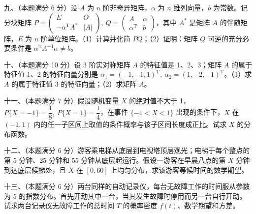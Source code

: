 \documentclass[UTF8,12pt]{ctexart}
\begin{document}
九、（本题满分 6 分）设 \(\displaystyle A\) 为 \(\displaystyle n\) 阶非奇异矩阵，\(\displaystyle \alpha\) 为 \(\displaystyle n\) 维列向量，\(\displaystyle b\) 为常数。记分块矩阵 \(\displaystyle P=\begin{pmatrix}E&O\\-\alpha^{\mathrm T}A^*&|A|\end{pmatrix},\allowbreak \ Q=\begin{pmatrix}A&\alpha\\\alpha^{\mathrm T}&b\end{pmatrix}\)，其中 \(\displaystyle A^*\) 是矩阵 \(\displaystyle A\) 的伴随矩阵，\(\displaystyle E\) 为 \(\displaystyle n\) 阶单位矩阵。（1）计算并化简 \(\displaystyle PQ\)；（2）证明：矩阵 \(\displaystyle Q\) 可逆的充分必要条件是 \(\displaystyle \alpha^{\mathrm T}A^{-1}\alpha\ne b\)。


十、（本题满分 10 分）设 3 阶实对称矩阵 \(\displaystyle A\) 的特征值是 1、2、3；矩阵 \(\displaystyle A\) 的属于特征值 1、2 的特征向量分别是 \(\displaystyle \alpha_1=(-1,\allowbreak -1,\allowbreak 1)^{\mathrm T},\allowbreak \ \alpha_2=(1,\allowbreak -2,\allowbreak -1)^{\mathrm T}\)。（1）求 \(\displaystyle A\) 的属于特征值 3 的特征向量；（2）求矩阵 \(\displaystyle A\)。


十一、（本题满分 7 分）假设随机变量 \(\displaystyle X\) 的绝对值不大于 1，\(\displaystyle P\{X=-1\}=\dfrac{\displaystyle 1}{\displaystyle 8},\allowbreak \ P\{X=1\}=\dfrac{\displaystyle 1}{\displaystyle 4}\)，在事件 \(\displaystyle \{-1<X<1\}\) 出现的条件下，\(\displaystyle X\) 在 \(\displaystyle (-1,\allowbreak 1)\) 内的任一子区间上取值的条件概率与该子区间长度成正比。试求 \(\displaystyle X\) 的分布函数。


十二、（本题满分 6 分）游客乘电梯从底层到电视塔顶层观光；电梯于每个整点的第 5 分钟、25 分钟和 55 分钟从底层起运行。假设一游客在早晨八点的第 \(\displaystyle X\) 分钟到达底层候梯处，且 \(\displaystyle X\) 在 \(\displaystyle [0,\allowbreak 60]\) 上均匀分布，求该游客等候时间的数学期望。


十三、（本题满分 6 分）两台同样的自动记录仪，每台无故障工作的时间服从参数为 5 的指数分布。首先开动其中一台，当其发生故障时停用而另一台自行开动。试求两台记录仪无故障工作的总时间 \(\displaystyle T\) 的概率密度 \(\displaystyle f(t)\)、数学期望和方差。
\end{document}
